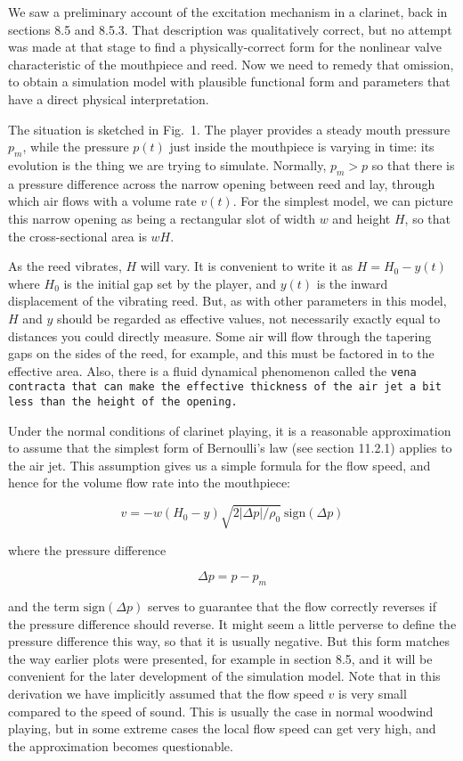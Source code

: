   We saw a preliminary account of the excitation mechanism in a clarinet, back 
  in sections 8.5 and 8.5.3. That description was qualitatively correct, but no 
  attempt was made at that stage to find a physically-correct form for the 
  nonlinear valve characteristic of the mouthpiece and reed. Now we need to 
  remedy that omission, to obtain a simulation model with plausible functional 
  form and parameters that have a direct physical interpretation. 

  The situation is sketched in Fig.\ 1. The player provides a steady mouth 
  pressure $p_m$, while the pressure $p(t)$ just inside the mouthpiece is 
  varying in time: its evolution is the thing we are trying to simulate. 
  Normally, $p_m > p$ so that there is a pressure difference across the narrow 
  opening between reed and lay, through which air flows with a volume rate 
  $v(t)$. For the simplest model, we can picture this narrow opening as being a 
  rectangular slot of width $w$ and height $H$, so that the cross-sectional 
  area is $wH$. 


  As the reed vibrates, $H$ will vary. It is convenient to write it as 
  $H=H_0-y(t)$ where $H_0$ is the initial gap set by the player, and $y(t)$ is 
  the inward displacement of the vibrating reed. But, as with other parameters 
  in this model, $H$ and $y$ should be regarded as effective values, not 
  necessarily exactly equal to distances you could directly measure. Some air 
  will flow through the tapering gaps on the sides of the reed, for example, 
  and this must be factored in to the effective area. Also, there is a fluid 
  dynamical phenomenon called the \tt{}vena contracta\rm{} that can make the 
  effective thickness of the air jet a bit less than the height of the opening. 

  Under the normal conditions of clarinet playing, it is a reasonable 
  approximation to assume that the simplest form of Bernoulli's law (see 
  section 11.2.1) applies to the air jet. This assumption gives us a simple 
  formula for the flow speed, and hence for the volume flow rate into the 
  mouthpiece: 

  $$v=-w(H_0-y) \sqrt{2 |\Delta p|/\rho_0} \mathrm{~sign} (\Delta p) \tag{1}$$ 

  where the pressure difference 

  $$\Delta p = p-p_m \tag{2}$$ 

  and the term $\mathrm{sign}(\Delta p)$ serves to guarantee that the flow 
  correctly reverses if the pressure difference should reverse. It might seem a 
  little perverse to define the pressure difference this way, so that it is 
  usually negative. But this form matches the way earlier plots were presented, 
  for example in section 8.5, and it will be convenient for the later 
  development of the simulation model. Note that in this derivation we have 
  implicitly assumed that the flow speed $v$ is very small compared to the 
  speed of sound. This is usually the case in normal woodwind playing, but in 
  some extreme cases the local flow speed can get very high, and the 
  approximation becomes questionable. 

